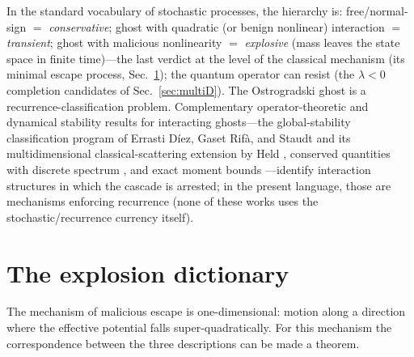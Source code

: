 \documentclass[11pt]{article}
\theoremstyle{definition}
\theoremstyle{remark}
\begin{document}
In the standard vocabulary of stochastic processes, the hierarchy is:
free/normal-sign $=$ \emph{conservative}; ghost with quadratic (or benign
nonlinear) interaction $=$ \emph{transient}; ghost with malicious
nonlinearity $=$ \emph{explosive} (mass leaves the state space in finite
time)---the last verdict at the level of the classical mechanism (its
minimal escape process, Sec.~\ref{sec:dictionary}); the quantum operator
can resist (the $\lambda<0$ completion candidates of
Sec.~\ref{sec:multiD}). The Ostrogradski ghost is a recurrence-classification problem.
Complementary operator-theoretic and dynamical stability results for
interacting
ghosts---the global-stability classification program of Errasti
D\'iez, Gaset Rif\`a, and Staudt \cite{ErrastiDiez2024} and its
multidimensional classical-scattering extension by
Held \cite{Held2025}, conserved quantities with discrete
spectrum \cite{Deffayet2026},
and exact moment bounds \cite{EwasiukProfumo2026}---identify
interaction
structures in which the cascade is arrested; in the present language,
those are mechanisms enforcing recurrence (none of these works uses
the stochastic/recurrence currency itself).

\section{The explosion dictionary}
\label{sec:dictionary}

The mechanism of malicious escape is one-dimensional: motion along a
direction where the effective potential falls super-quadratically. For
this mechanism the correspondence between the three descriptions can be
made a theorem.
\end{document}

